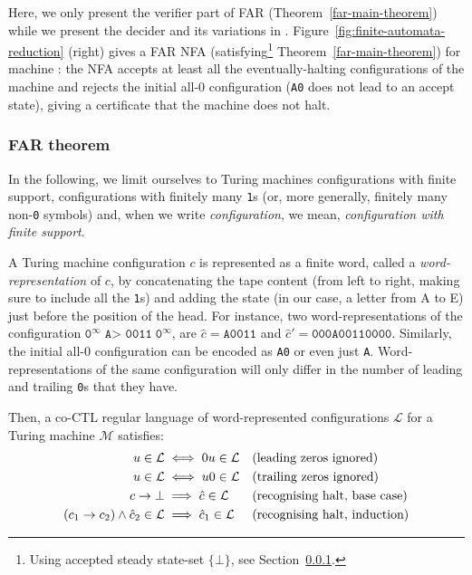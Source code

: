 Here, we only present the verifier part of FAR (Theorem~\ref{far-main-theorem}) while we present the decider and its variations in \cite{bbchallenge_part1}. Figure~\ref{fig:finite-automata-reduction} (right) gives a FAR NFA (\ie satisfying\footnote{Using accepted steady state-set $\{\bot\}$, see Section~\ref{sec:FAR:theorem}.} Theorem~\ref{far-main-theorem}) for machine : the NFA accepts at least all the eventually-halting configurations of the machine and rejects the initial all-0 configuration (\ie \texttt{A0} does not lead to an accept state), giving a certificate that the machine does not halt.

\subsubsection{FAR theorem}\label{sec:FAR:theorem}

In the following, we limit ourselves to Turing machines configurations with finite support, \ie configurations with finitely many \texttt{1}s (or, more generally, finitely many non-\texttt{0} symbols) and, when we write \textit{configuration}, we mean, \textit{configuration with finite support}.

A Turing machine configuration $c$ is represented as a finite word, called a \textit{word-representation} of $c$, by concatenating the tape content (from left to right, making sure to include all the \texttt{1}s) and adding the state (in our case, a letter from A to E) just before the position of the head. For instance, two word-representations of the configuration $\texttt{0}^\infty \; \texttt{A> 0011} \; \texttt{0}^\infty$, are $\hat{c} = \texttt{A0011}$ and $\hat{c}' = \texttt{000A00110000}$. Similarly, the initial all-0 configuration can be encoded as \texttt{A0} or even just \texttt{A}. Word-representations of the same configuration will only differ in the number of leading and trailing \texttt{0}s that they have.


Then, a co-CTL regular language of word-represented configurations $\mathcal{L}$ for a Turing machine $\mathcal{M}$ satisfies:
\begin{align}
    u \in \mathcal{L}                               & \iff 0u \in \mathcal{L}           &  & \text{(leading zeros ignored)}
    \label{eq:lzignore}
    \\
    u \in \mathcal{L}                               & \iff u0 \in \mathcal{L}           &  & \text{(trailing zeros ignored)}
    \label{eq:tzignore}
    \\
    c\to\bot                                    & \implies \hat{c} \in \mathcal{L}  &  & \text{(recognising halt, base case)} \nonumber \\
    (c_1\to c_2)\land \hat{c}_2 \in \mathcal{L} & \implies\hat{c}_1 \in \mathcal{L} &  & \text{(recognising halt, induction)} \nonumber
\end{align}


